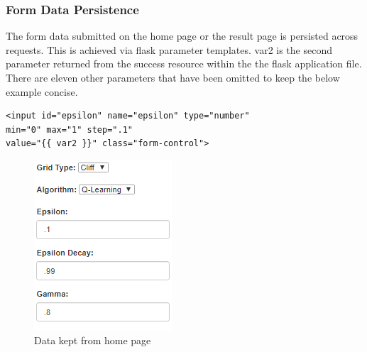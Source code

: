 \subsubsection{Form Data Persistence}
The form data submitted on the home page or the result page is persisted across requests. This is achieved via flask parameter templates. {{var2}} is the second parameter returned from the success resource within the the flask application file. There are eleven other parameters that have been omitted to keep the below example concise.
\begin{verbatim}
<input id="epsilon" name="epsilon" type="number" 
min="0" max="1" step=".1" 
value="{{ var2 }}" class="form-control">
\end{verbatim}
\begin{figure}[H]
	\centering
	\includegraphics[width=0.7\linewidth]{img/result}
	\caption{Data kept from home page}
	\label{fig:result}
\end{figure}

